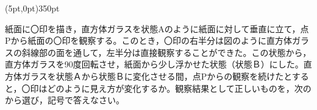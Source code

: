 \begin{mawarikomi}(5pt,0pt){350pt}{}
\begin{Enumerate*}
\item 紙面に〇印を描き，直方体ガラスを状態Aのように紙面に対して垂直に立て，点Pから紙面の〇印を観察する。このとき，〇印の右半分は図のように直方体ガラスの斜線部の面を通して，左半分は直接観察することができた。この状態から，直方体ガラスを90度回転させ，紙面から少し浮かせた状態（状態Ｂ）にした。直方体ガラスを状態Ａから状態Ｂに変化させる間，点Pからの観察を続けたとすると，〇印はどのように見え方が変化するか。観察結果として正しいものを，次の\yontaku から選び，記号で答えなさい。
\end{Enumerate*}
\end{mawarikomi}
\begin{center}

\end{center}
